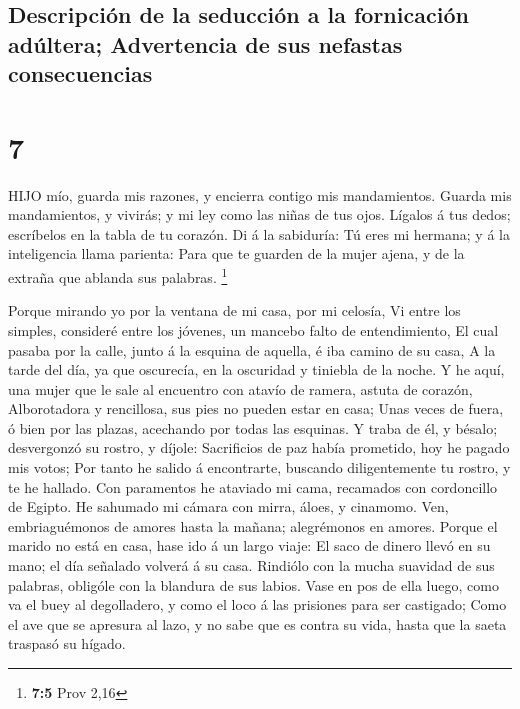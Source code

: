 \hypertarget{descripciuxf3n-de-la-seducciuxf3n-a-la-fornicaciuxf3n-aduxfaltera-advertencia-de-sus-nefastas-consecuencias}{%
\subsection{Descripción de la seducción a la fornicación adúltera;
Advertencia de sus nefastas
consecuencias}\label{descripciuxf3n-de-la-seducciuxf3n-a-la-fornicaciuxf3n-aduxfaltera-advertencia-de-sus-nefastas-consecuencias}}

\hypertarget{section-6}{%
\section{7}\label{section-6}}

 HIJO mío, guarda mis razones, y encierra contigo mis
mandamientos.  Guarda mis mandamientos, y vivirás; y mi ley
como las niñas de tus ojos.  Lígalos á tus dedos; escríbelos
en la tabla de tu corazón.  Di á la sabiduría: Tú eres mi
hermana; y á la inteligencia llama parienta:  Para que te
guarden de la mujer ajena, y de la extraña que ablanda sus palabras.
\footnote{\textbf{7:5} Prov 2,16}

 Porque mirando yo por la ventana de mi casa, por mi
celosía,  Vi entre los simples, consideré entre los jóvenes,
un mancebo falto de entendimiento,  El cual pasaba por la
calle, junto á la esquina de aquella, é iba camino de su casa,
 A la tarde del día, ya que oscurecía, en la oscuridad y
tiniebla de la noche.  Y he aquí, una mujer que le sale al
encuentro con atavío de ramera, astuta de corazón, 
Alborotadora y rencillosa, sus pies no pueden estar en casa;
 Unas veces de fuera, ó bien por las plazas, acechando por
todas las esquinas.  Y traba de él, y bésalo; desvergonzó
su rostro, y díjole:  Sacrificios de paz había prometido,
hoy he pagado mis votos;  Por tanto he salido á
encontrarte, buscando diligentemente tu rostro, y te he hallado.
 Con paramentos he ataviado mi cama, recamados con
cordoncillo de Egipto.  He sahumado mi cámara con mirra,
áloes, y cinamomo.  Ven, embriaguémonos de amores hasta la
mañana; alegrémonos en amores.  Porque el marido no está en
casa, hase ido á un largo viaje:  El saco de dinero llevó
en su mano; el día señalado volverá á su casa.  Rindiólo
con la mucha suavidad de sus palabras, obligóle con la blandura de sus
labios.  Vase en pos de ella luego, como va el buey al
degolladero, y como el loco á las prisiones para ser castigado;
 Como el ave que se apresura al lazo, y no sabe que es
contra su vida, hasta que la saeta traspasó su hígado.

